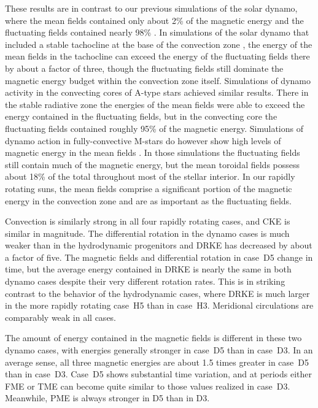 These results are in contrast to our previous simulations of the solar
dynamo, where the mean fields contained only about 2\% of the magnetic
energy and the fluctuating fields contained nearly 98\%
\citep{Brun_et_al_2004}.  In simulations of the solar dynamo that
included a stable tachocline at the base of the convection zone
\citep{Browning_et_al_2006}, the energy of the mean fields in the
tachocline can exceed the energy of the fluctuating fields there 
by about a factor of three, though 
the fluctuating fields still dominate the magnetic
energy budget within the convection zone itself.  Simulations of dynamo
activity in the convecting cores of A-type stars
\citep{Brun_et_al_2005} achieved similar results.  There in the
stable radiative zone the energies of the mean fields were able to
exceed the energy contained in the fluctuating fields, but in the
convecting core the fluctuating fields contained roughly 95\% of the
magnetic energy.  Simulations of dynamo action in fully-convective
M-stars do however show high levels of magnetic energy in the mean
fields \citep{Browning_2008}. In those simulations the fluctuating
fields still contain much of the magnetic energy,
but the mean toroidal fields possess about 18\% of the total
throughout most of the stellar interior. 
In our rapidly rotating suns, the mean fields
comprise a significant portion of the magnetic energy in the
convection zone and are as important as the fluctuating fields.

Convection is similarly strong in all four rapidly rotating cases, and
CKE is similar in magnitude.  The differential rotation in the dynamo
cases is much weaker than in the hydrodynamic progenitors and DRKE has decreased by
about a factor of five.  The magnetic fields and differential rotation
in case~D5 change in time, but the average energy contained in DRKE is
nearly the same in both dynamo cases despite their very different
rotation rates.  This is in striking contrast to the behavior of the
hydrodynamic cases, where DRKE is much larger in the more rapidly
rotating case~H5 than in case~H3.  Meridional circulations are
comparably weak in all cases. 

The amount of energy contained in the magnetic fields is different in
these two dynamo cases, with energies generally stronger in case~D5
than in case~D3. In an average sense, all three magnetic energies are
about 1.5 times greater in case~D5 than in case~D3.  Case~D5 shows
substantial time variation, and at periods either FME or TME can become
quite similar to those values realized in case~D3.  Meanwhile, PME is always
stronger in D5 than in D3.


